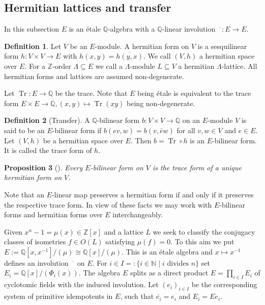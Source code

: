 \documentclass[a4paper]{amsart}
\theoremstyle{definition}
\newtheorem{definition}{Definition}[section]
\theoremstyle{plain}
\newtheorem{proposition}[definition]{Proposition}
\DeclareMathOperator{\Tr}{Tr}
\newcommand{\QQ}{\mathbb{Q}}
\newcommand{\NN}{\mathbb{N}}
\newcommand{\ZZ}{\mathbb{Z}}
\begin{document}
\subsection{Hermitian lattices and transfer}\label{transfer}
In this subsection $E$ is an \'etale $\QQ$-algebra with a $\QQ$-linear involution $\overline{\phantom{x}}\colon E \to E$.

\begin{definition}
Let $V$ be an $E$-module. A hermitian form on $V$ is a sesquilinear form $h \colon V \times V \to E$ with $h(x,y) = \overline{h(y,x)}$. We call $(V,h)$ a hermitian space over $E$.
For a $\ZZ$-order $\Lambda \subseteq E$ we call a $\Lambda$-module $L \subseteq V$ a hermitian $\Lambda$-lattice. All hermitian forms and lattices are assumed non-degenerate.
\end{definition}
Let  $\Tr \colon E \to \QQ$ be the trace.
Note that $E$ being \'etale is equivalent to the trace form $E\times E \to \QQ, (x,y) \mapsto \Tr(xy)$ being non-degenerate.

\begin{definition}[Transfer]
A $\QQ$-bilinear form $b \colon V \times V \to \QQ$ on an $E$-module $V$ is said to be an $E$-bilinear form if $b(ev,w) = b(v,\bar e w)$ for all $v,w \in V$ and $e \in E$.
Let $(V,h)$ be a hermitian space over $E$. Then $b = \Tr \circ h$ is an $E$-bilinear form. It is called the trace form of $h$.
\end{definition}

\begin{proposition}[\cite{milnor1969}]
Every $E$-bilinear form on $V$ is the trace form of a unique hermitian form on $V$.
\end{proposition}

Note that an $E$-linear map preserves a hermitian form if and only if it preserves the respective trace form. In view of these facts we may work with $E$-bilinear forms and hermitian forms over $E$ interchangeably.

Given $x^n-1=\mu(x)\in \ZZ[x]$ and a lattice $L$ we seek to classify the conjugacy classes of isometries $f\in O(L)$ satisfying $\mu(f) = 0$.
To this aim we put
$E:=\QQ[x,x^{-1}]/(\mu)\cong \QQ[x]/(\mu)$. This is an \'etale algebra and
$x \mapsto  x^{-1}$ defines an involution
$\overline{\phantom{x}} $ on $E$.
For $i \in I =: \{i \in \NN \mid i \text{ divides } n\}$ set $E_i=\QQ[x]/(\Phi_i(x))$.
The algebra $E$ splits as a direct product $E= \prod_{i \in I} E_i$
of cyclotomic fields with the induced involution.
Let $(e_i)_{i \in I}$ be the corresponding system of primitive idempotents in $E$, such that $\overline{e_i} = e_i$ and $E_i = E e_i$.
\end{document}
